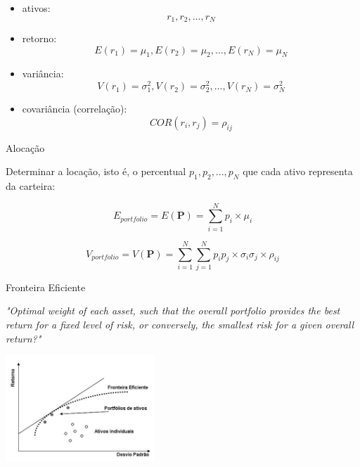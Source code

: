 \documentclass{beamer}
\begin{document}
\begin{frame}{\cite{mkv}}

\begin{itemize}
\item ativos: $$r_1,r_2,...,r_N$$
\item retorno: $$E(r_1)=\mu_1,E(r_2)=\mu_2,...,E(r_N)=\mu_N$$
\item variância: $$V(r_1)=\sigma^2_1,V(r_2)=\sigma^2_2,...,V(r_N)=\sigma^2_N$$
\item covariância (correlação): $$COR(r_i,r_j) = \rho_{ij}$$
\end{itemize}


\end{frame}

\begin{frame}{Alocação}

Determinar a locação, isto é, o percentual $p_1,p_2,...,p_N$ que cada ativo representa da carteira:

  
\begin{equation}
E_{portfolio} = E(\mathbf{ P})=  \sum_{i=1}^N p_i \times \mu_i
\end{equation}


\begin{equation}
V_{portfolio} =V(\mathbf{ P})= \sum_{i=1}^N\sum_{j=1}^N p_i p_j \times \sigma_i \sigma_j \times  \rho_{ij}
\end{equation}

\end{frame}




\begin{frame}{Fronteira Eficiente}


\textit{"Optimal weight of each asset, such that the overall portfolio provides the best return for a fixed level of risk, or conversely, the smallest risk for a given overall
return?"} \cite{Laloux1999}



\begin{center}
 \includegraphics[height=4cm,keepaspectratio]{marko_02.png}
 \end{center}
 
\end{frame}
\end{document}
